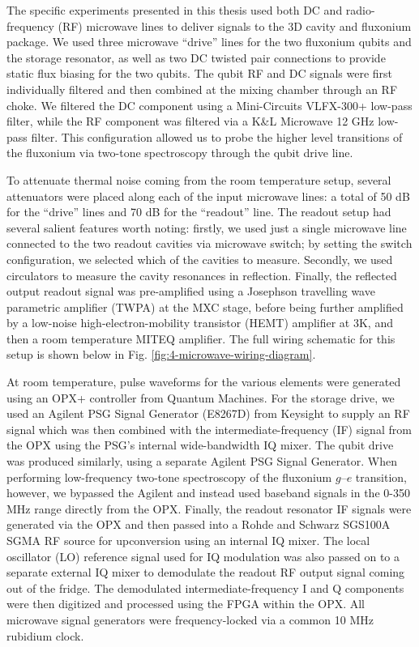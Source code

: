 The specific experiments presented in this thesis used both DC and radio-frequency (RF) microwave lines to deliver signals to the 3D cavity and fluxonium package. We used three microwave ``drive'' lines for the two fluxonium qubits and the storage resonator, as well as two DC twisted pair connections to provide static flux biasing for the two qubits. The qubit RF and DC signals were first individually filtered and then combined at the mixing chamber through an RF choke. We filtered the DC component using a Mini-Circuits VLFX-300+ low-pass filter, while the RF component was filtered via a K\&L Microwave 12 GHz low-pass filter. This configuration allowed us to probe the higher level transitions of the fluxonium via two-tone spectroscopy through the qubit drive line. 

To attenuate thermal noise coming from the room temperature setup, several attenuators were placed along each of the input microwave lines: a total of 50 dB for the ``drive'' lines and 70 dB for the ``readout'' line. The readout setup had several salient features worth noting: firstly, we used just a single microwave line connected to the two readout cavities via microwave switch; by setting the switch configuration, we selected which of the cavities to measure. Secondly, we used circulators to measure the cavity resonances in reflection. Finally, the reflected output readout signal was pre-amplified using a Josephson travelling wave parametric amplifier (TWPA) at the MXC stage, before being further amplified by a low-noise high-electron-mobility transistor (HEMT) amplifier at 3K, and then a room temperature MITEQ amplifier. The full wiring schematic for this setup is shown below in Fig. \ref{fig:4-microwave-wiring-diagram}. 

At room temperature, pulse waveforms for the various elements were generated using an OPX+ controller from Quantum Machines. For the storage drive, we used an Agilent PSG Signal Generator (E8267D) from Keysight to supply an RF signal which was then combined with the intermediate-frequency (IF) signal from the OPX using the PSG's internal wide-bandwidth IQ mixer. The qubit drive was produced similarly, using a separate Agilent PSG Signal Generator. When performing low-frequency two-tone spectroscopy of the fluxonium $g$--$e$ transition, however, we bypassed the Agilent and instead used baseband signals in the 0-350 MHz range directly from the OPX. Finally, the readout resonator IF signals were generated via the OPX and then passed into a Rohde and Schwarz SGS100A SGMA RF source for upconversion using an internal IQ mixer. The local oscillator (LO) reference signal used for IQ modulation was also passed on to a separate external IQ mixer to demodulate the readout RF output signal coming out of the fridge. The demodulated intermediate-frequency I and Q components were then digitized and processed using the FPGA within the OPX. All microwave signal generators were frequency-locked via a common 10 MHz rubidium clock. 

